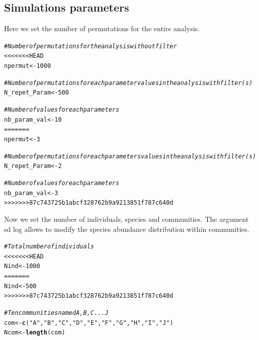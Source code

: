 \documentclass[12pt]{article}\usepackage[]{graphicx}\usepackage[]{color}
\makeatletter
\newcommand{\hlnum}[1]{\textcolor[rgb]{0.686,0.059,0.569}{#1}}%
\newcommand{\hlstr}[1]{\textcolor[rgb]{0.192,0.494,0.8}{#1}}%
\newcommand{\hlcom}[1]{\textcolor[rgb]{0.678,0.584,0.686}{\textit{#1}}}%
\newcommand{\hlstd}[1]{\textcolor[rgb]{0.345,0.345,0.345}{#1}}%
\newcommand{\hlkwb}[1]{\textcolor[rgb]{0.69,0.353,0.396}{#1}}%
\newcommand{\hlkwd}[1]{\textcolor[rgb]{0.737,0.353,0.396}{\textbf{#1}}}%
\newenvironment{kframe}{%
 \def\at@end@of@kframe{}%
 \ifinner\ifhmode%
  \def\at@end@of@kframe{\end{minipage}}%
  \begin{minipage}{\columnwidth}%
 \fi\fi%
 \def\FrameCommand##1{\hskip\@totalleftmargin \hskip-\fboxsep
 \colorbox{shadecolor}{##1}\hskip-\fboxsep
     \hskip-\linewidth \hskip-\@totalleftmargin \hskip\columnwidth}%
 \MakeFramed {\advance\hsize-\width
   \@totalleftmargin\z@ \linewidth\hsize
   \@setminipage}}%
 {\par\unskip\endMakeFramed%
 \at@end@of@kframe}
\newenvironment{knitrout}{}{} %
\makeatother
\begin{document}
\begin{landscape}
\begin{landscape}
\begin{table}[h]
\begin{tabular}{m{2.7cm} m{5.3cm} m{6.3cm} m{6.2cm} m{2.5cm}}
\end{tabular}
\end{table}
\end{landscape}


  
  
  
  
  
  
  \subsection{Simulations parameters}

Here we set the number of permutations for the entire analysis. 

\begin{knitrout}\small
{}\color{fgcolor}\begin{kframe}
\begin{alltt}
\hlcom{#Number of permutations for the analysis without filter}
<<<<<<< HEAD
\hlstd{npermut} \hlkwb{<-} \hlnum{1000}

\hlcom{#Number of permutations for each parameter values in the analysis with filter(s)}
\hlstd{N_repet_Param} \hlkwb{<-} \hlnum{500}

\hlcom{#Number of values for each parameters}
\hlstd{nb_param_val} \hlkwb{<-} \hlnum{10}
=======
\hlstd{npermut} \hlkwb{<-} \hlnum{3}

\hlcom{#Number of permutations for each parameters values in the analysis with filter(s)}
\hlstd{N_repet_Param} \hlkwb{<-} \hlnum{2}

\hlcom{#Number of values for each parameters}
\hlstd{nb_param_val} \hlkwb{<-} \hlnum{3}
>>>>>>> 87c743725b1abcf328762b9a9213851f787c640d
\end{alltt}
\end{kframe}
\end{knitrout}

Now we set the number of individuals, species and communities. 
The argument sd log allows to modify the species abundance distribution within communities.

\begin{knitrout}\small
{}\color{fgcolor}\begin{kframe}
\begin{alltt}
\hlcom{#Total number of individuals}
<<<<<<< HEAD
\hlstd{Nind} \hlkwb{<-} \hlnum{1000}
=======
\hlstd{Nind} \hlkwb{<-} \hlnum{500}
>>>>>>> 87c743725b1abcf328762b9a9213851f787c640d

\hlcom{#Ten communities named A, B, C ... J}
\hlstd{com} \hlkwb{<-} \hlkwd{c}\hlstd{(}\hlstr{"A"}\hlstd{,} \hlstr{"B"}\hlstd{,} \hlstr{"C"}\hlstd{,} \hlstr{"D"}\hlstd{,} \hlstr{"E"}\hlstd{,} \hlstr{"F"}\hlstd{,} \hlstr{"G"}\hlstd{,} \hlstr{"H"}\hlstd{,} \hlstr{"I"}\hlstd{,} \hlstr{"J"}\hlstd{)}
\hlstd{Ncom} \hlkwb{<-} \hlkwd{length}\hlstd{(com)}


\end{alltt}
\end{kframe}
\end{knitrout}
\end{landscape}
\end{document}
